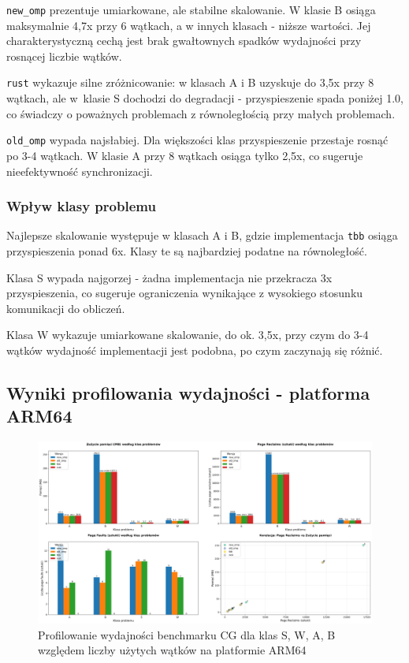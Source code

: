 \texttt{new\_omp} prezentuje umiarkowane, ale stabilne skalowanie. W klasie B osiąga maksymalnie 4,7x przy 6 wątkach, a w innych klasach - niższe wartości. Jej charakterystyczną cechą jest brak gwałtownych spadków wydajności przy rosnącej liczbie wątków.

\texttt{rust} wykazuje silne zróżnicowanie: w klasach A i B uzyskuje do 3,5x przy 8 wątkach, ale w~klasie S dochodzi do degradacji - przyspieszenie spada poniżej 1.0, co świadczy o poważnych problemach z równoległością przy małych problemach.

\texttt{old\_omp} wypada najsłabiej. Dla większości klas przyspieszenie przestaje rosnąć po 3-4 wątkach. W klasie A przy 8 wątkach osiąga tylko 2,5x, co sugeruje nieefektywność synchronizacji.

\subsubsection{Wpływ klasy problemu}
Najlepsze skalowanie występuje w klasach A i B, gdzie implementacja \texttt{tbb} osiąga przyspieszenia ponad 6x. Klasy te są najbardziej podatne na równoległość.

Klasa S wypada najgorzej - żadna implementacja nie przekracza 3x przyspieszenia, co sugeruje ograniczenia wynikające z wysokiego stosunku komunikacji do obliczeń.

Klasa W wykazuje umiarkowane skalowanie, do ok. 3,5x, przy czym do 3-4 wątków wydajność implementacji jest podobna, po czym zaczynają się różnić.
\subsection{Wyniki profilowania wydajności - platforma ARM64}
\begin{figure}[H]
    \centering
    \includegraphics[width=\textwidth]{analiza/images/parallel/cg/arm/chart_01_memory_comparison.png}
    \caption{Profilowanie wydajności benchmarku CG dla klas S, W, A, B względem liczby użytych wątków na platformie ARM64}
    \label{cg_porownanie_zuzycia_pamieci}
\end{figure}

